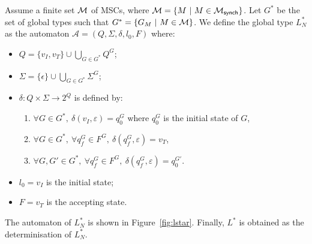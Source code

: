 \begin{definition}\label{def:lstar}
	Assume a finite set $\mathcal{M}$ of MSCs, where
	$\mathcal{M} = \{M\ |\ M \in \mathcal{M}_{\mathsf{synch}}\}$. Let $G^*$
	be the set of global types such that $G^*=\{G_M\ |\ M \in \mathcal{M}\}$.
	We define the global type $L^*_{N}$ as the automaton
	$\mathcal A = (Q,\Sigma, \delta, l_0, F)$ where:
	\begin{itemize}
		\item $Q = \{v_I,v_T\}\cup \bigcup_{G\in G^*} Q^G$;
		\item $\Sigma = \{\epsilon\}\cup\bigcup_{G\in G^*} \Sigma^G$;
		\item $\delta: Q \times \Sigma \rightarrow 2^Q$ is defined by:
			      \begin{enumerate}
				       \item $\forall G \in G^*,\ \delta(v_I, \varepsilon) = q_0^G$ where $q_0^G$ is the initial state of $G$,
				       \item $\forall G \in G^*,\ \forall q_f^G \in F^G,\ \delta(q_f^G, \varepsilon) = v_T$,
				       \item $\forall G, G' \in G^*,\ \forall q_f^G \in F^G,\ \delta(q_f^G, \varepsilon) = q_0^{G'}$.
			      \end{enumerate}
		\item $l_0 = v_I$ is the initial state;
		\item $F = v_T$ is the accepting state.
	\end{itemize}
	The automaton of $L^*_{N}$ is shown in Figure~\ref{fig:lstar}.  
	Finally, $L^*$ is obtained as the determinisation of $L^*_{N}$.
\end{definition}

